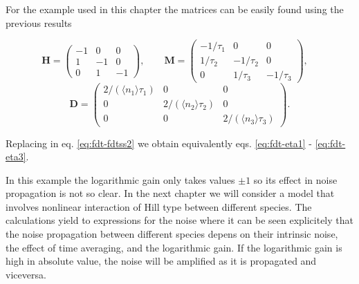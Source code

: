 For the example used in this chapter the matrices can be easily found using the previous results

\begin{equation*}
  \mathbf{H} = \begin{pmatrix}
    -1 & 0 & 0 \\
    1 & -1 & 0 \\
    0 & 1 & -1
  \end{pmatrix},\quad\quad
  \mathbf{M} = \begin{pmatrix}
    -1/\tau_1 & 0 & 0 \\
    1/\tau_2 & -1/\tau_2 & 0 \\
    0 & 1/\tau_3 & -1/\tau_3
  \end{pmatrix},\quad  
\end{equation*}
\begin{equation*}
  \mathbf{D} = \begin{pmatrix}
    2/(\langle n_1\rangle\tau_1) & 0 & 0 \\
    0 & 2/(\langle n_2\rangle\tau_2) & 0 \\
    0 & 0 & 2/(\langle n_3\rangle\tau_3)
  \end{pmatrix}.
\end{equation*}

Replacing in eq. \eqref{eq:fdt-fdtss2} we obtain equivalently eqs. \eqref{eq:fdt-eta1} - \eqref{eq:fdt-eta3}.

In this example the logarithmic gain only takes values $\pm 1$ so its effect in noise propagation is not so clear. In the next chapter we will consider a model that involves nonlinear interaction of Hill type between different species. The calculations yield to expressions for the noise where  it can be seen explicitely that the noise propagation between different species depens on their intrinsic noise, the effect of time averaging, and the logarithmic gain. If the logarithmic gain is high in absolute value, the noise will be amplified as it is propagated and viceversa. 
